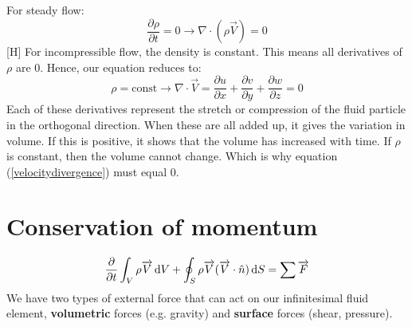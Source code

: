 \documentclass[class=report, crop=false, 12pt,a4paper]{standalone}
\begin{document}
For steady flow:
\begin{equation}
  \frac{\partial \rho}{\partial t} = 0 \rightarrow \nabla \cdot (\rho \overrightarrow{V}) = 0
\end{equation}[H]
For incompressible flow, the density is constant. This means all derivatives of $\rho$ are 0. Hence, our equation reduces to:
\begin{equation}
  \rho = \textrm{const} \rightarrow \nabla \cdot \overrightarrow{V} = \frac{\partial u}{\partial x} + \frac{\partial v}{\partial y} + \frac{\partial w}{\partial z} = 0 
  \label{velocitydivergence}
\end{equation}
Each of these derivatives represent the stretch or compression of the fluid particle in the orthogonal direction. When these are all added up, it gives the variation in volume. If this is positive, it shows that the volume has increased with time. If $\rho$ is constant, then the volume cannot change. Which is why equation (\ref{velocitydivergence}) must equal 0.
\section{Conservation of momentum}
\begin{equation}
  \frac{\partial}{\partial t} \int_V \rho \overrightarrow{V} \dif V + \oint_S \rho \overrightarrow{V}(\overrightarrow{V} \cdot \hat{n}) \dif S = \sum \overrightarrow{F}
\end{equation}
We have two types of external force that can act on our infinitesimal fluid element, \textbf{volumetric} forces (e.g. gravity) and \textbf{surface} forces (shear, pressure).
\end{document}
